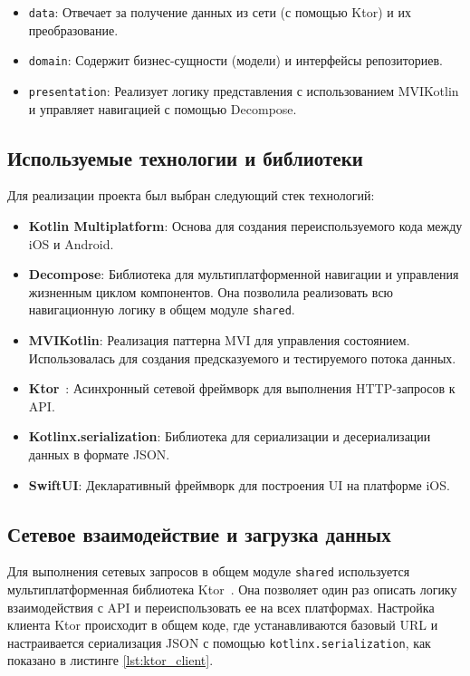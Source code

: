 \documentclass[14pt, russian]{scrartcl}
\begin{document}
\begin{itemize}
    \item \texttt{data}: Отвечает за получение данных из сети (с помощью Ktor) и их преобразование.
    \item \texttt{domain}: Содержит бизнес-сущности (модели) и интерфейсы репозиториев.
    \item \texttt{presentation}: Реализует логику представления с использованием MVIKotlin и управляет навигацией с помощью Decompose.
\end{itemize}

\subsection{Используемые технологии и библиотеки}

Для реализации проекта был выбран следующий стек технологий:

\begin{itemize}
    \item \textbf{Kotlin Multiplatform}: Основа для создания переиспользуемого кода между iOS и Android.
    \item \textbf{Decompose}: Библиотека для мультиплатформенной навигации и управления жизненным циклом компонентов. Она позволила реализовать всю навигационную логику в общем модуле \texttt{shared}.
    \item \textbf{MVIKotlin}: Реализация паттерна MVI для управления состоянием. Использовалась для создания предсказуемого и тестируемого потока данных.
    \item \textbf{Ktor}~\cite{ktor}: Асинхронный сетевой фреймворк для выполнения HTTP-запросов к API.
    \item \textbf{Kotlinx.serialization}: Библиотека для сериализации и десериализации данных в формате JSON.
    \item \textbf{SwiftUI}: Декларативный фреймворк для построения UI на платформе iOS.
\end{itemize}

\subsection{Сетевое взаимодействие и загрузка данных}

Для выполнения сетевых запросов в общем модуле \texttt{shared} используется мультиплатформенная библиотека Ktor~\cite{ktor}. Она позволяет один раз описать логику взаимодействия с API и переиспользовать ее на всех платформах. Настройка клиента Ktor происходит в общем коде, где устанавливаются базовый URL и настраивается сериализация JSON с помощью \texttt{kotlinx.serialization}, как показано в листинге \ref{lst:ktor_client}.
\end{document}
